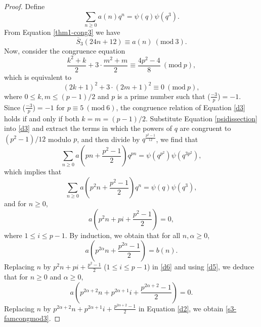 \documentclass[12pt]{amsart}
\theoremstyle{plain}
\theoremstyle{definition}
\begin{document}
\begin{proof} Define
\begin{equation} 
\sum_{n\geq 0} a(n)q^{n} = \psi(q) \psi(q^{3}). \label{d1}
\end{equation}
From  Equation \eqref{thm1-cong3} we have 
\begin{equation}
\overline{S}_{3}(24n+12) \equiv a(n) \ (\mathrm{mod} \ 3).  \label{d2}
\end{equation} 
Now, consider the congruence equation
\[
\frac{k^{2}+k}{2}+3\cdot \frac{m^{2}+m}{2} \equiv  \frac{4p^{2}-4}{8} \ (\mathrm{mod} \ p), 
\]
which is equivalent to
\begin{equation}
(2k+1)^{2}+ 3\cdot (2m+1)^{2}  \equiv  0 \ (\mathrm{mod} \ p), \label{d3}
\end{equation}
where $0 \leq k,m \leq (p-1)/2$ and $p$ is a prime number such that ($\frac{-3}{p}$)$=-1$. Since ($\frac{-3}{p}$)$=-1$ for $p \equiv 5 \ (\mathrm{mod} \ 6)$, the congruence relation of Equation \eqref{d3} holds if and only if both $k=m=(p-1)/2$. Substitute Equation \eqref{psidissection} into \eqref{d3} and extract the terms in which the powers of $q$ are congruent to $(p^{2}-1)/12$ modulo $p$, and then divide by $q^{\frac{p^{2}-1}{12}}$, we find that
\[
\sum_{n\geq 0} a \left(pn+\frac{p^{2}-1}{2} \right) q^{pn} = \psi(q^{p^{2}}) \psi(q^{3p^{2}}),
\]
which implies that 
\begin{equation}
\sum_{n\geq 0} a\left( p^{2}n+\frac{p^{2}-1}{2} \right)q^{n} = \psi(q) \psi(q^{3}), \label{d4}
\end{equation}
and for $n\geq 0$,
\begin{equation}
a \left(p^{2}n+pi+\frac{p^{2}-1}{2}\right) = 0, \label{d5}
\end{equation}
where  $1\leq i \leq p-1$. By induction, we obtain  that for all $n, \alpha \geq 0$,
\begin{equation}
a\left( p^{2\alpha}n+\frac{p^{2\alpha}-1}{2} \right)=b(n). \label{d6}
\end{equation}
Replacing $n$ by $p^{2}n+pi+\frac{p^{2}-1}{2}$ ($1\leq i \leq p-1$) in \eqref{d6} and using \eqref{d5}, we deduce that for $n\geq 0$ and $\alpha \geq 0$,
\[
a\left( p^{2\alpha+2}n+p^{2\alpha+1}i+\frac{p^{2\alpha+2}-1}{2} \right)=0.
\]
Replacing $n$ by $p^{2\alpha+2}n+p^{2\alpha+1}i+\frac{p^{2\alpha+2}-1}{2}$ in Equation \eqref{d2}, we obtain \eqref{s3-famcongmod3}.
\end{proof}
\end{document}
